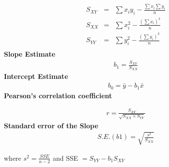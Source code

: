 \documentclass[a4paper,12pt]{article}
\begin{document}

\begin{eqnarray*}
S_{XY} &=&
\sum x_iy_i - \frac{\sum x_i\sum y_i}{n}\\
S_{XX} &=&
\sum x_i^2 - \frac{(\sum x_i)^2}{n}\\
S_{YY} &=&
\sum y_i^2 - \frac{(\sum y_i)^2}{n}\\
\end{eqnarray*}
{\bf Slope Estimate}
\begin{eqnarray*}
b_1 = \frac{S_{XY}}{S_{XX}}
\end{eqnarray*}
{\bf Intercept Estimate}
\begin{eqnarray*}
 b_0 = \bar{y} -b_1\bar{x}
\end{eqnarray*}
{\bf Pearson's correlation coefficient}

\begin{eqnarray*}
r = \frac{S_{XY}}{\sqrt{S_{XX} \times S_{YY}}}
\end{eqnarray*}
{\bf Standard error of the Slope}
\begin{eqnarray*}
S.E.(b1) = \sqrt{\frac{s^2}{S_{XX}}}
\end{eqnarray*}

where $s^2 = \frac{SSE}{n-2}$
and SSE $= S_{YY} - b_1S_{XY}$
\end{document}
